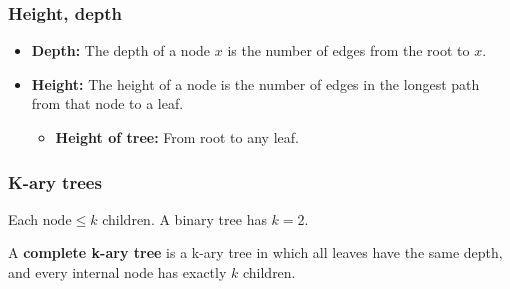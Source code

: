     \subsubsection{Height, depth}
    \begin{definition}
        \begin{itemize}
            \item \textbf{Depth:} The depth of a node \( x \) is the number of edges from the root to \( x \).
            
            \item \textbf{Height:} The height of a node is the number of edges in the longest path from that node to a leaf.
            \begin{itemize}
                \item \textbf{Height of tree:} From root to any leaf.
            \end{itemize}
        \end{itemize}

    \end{definition}

    \subsubsection{K-ary trees}
    \begin{definition}
            Each $\text{node} \leq k$ children. A binary tree has \( k = 2 \).
            \vspace{1em}

            A \textbf{complete k-ary tree} is a k-ary tree in which all leaves have the same depth, and every internal node has exactly \( k \) children. 
    \end{definition}

    

